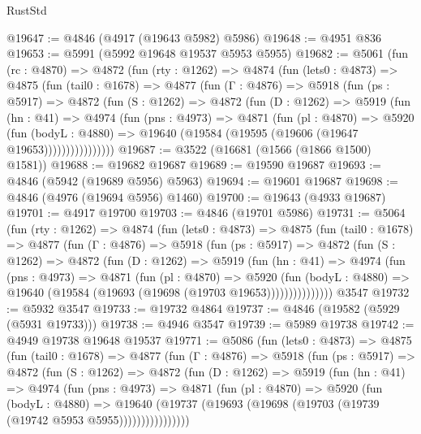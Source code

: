 \begin{lexlean}{RustStd}
\begin{coremodule}
@19647 := @4846 (@4917 (@19643 @5982) @5986)
@19648 := @4951 @836
@19653 := @5991 (@5992 @19648 @19537 @5953 @5955)
@19682 := @5061
    (fun (rc : @4870) =>
    @4872
      (fun (rty : @1262) =>
      @4874
        (fun (lets0 : @4873) =>
        @4875
          (fun (tail0 : @1678) =>
          @4877
            (fun (Γ : @4876) =>
            @5918
              (fun (ps : @5917) =>
              @4872
                (fun (S : @1262) =>
                @4872
                  (fun (D : @1262) =>
                  @5919
                    (fun (hn : @41) =>
                    @4974
                      (fun (pns : @4973) =>
                      @4871
                        (fun (pl : @4870) =>
                        @5920
                          (fun (bodyL : @4880) =>
                          @19640 (@19584 (@19595 (@19606 (@19647 @19653))))))))))))))))
@19687 := @3522 (@16681 (@1566 (@1866 @1500) @1581))
@19688 := @19682 @19687
@19689 := @19590 @19687
@19693 := @4846 (@5942 (@19689 @5956) @5963)
@19694 := @19601 @19687
@19698 := @4846 (@4976 (@19694 @5956) @1460)
@19700 := @19643 (@4933 @19687)
@19701 := @4917 @19700
@19703 := @4846 (@19701 @5986)
@19731 := @5064
    (fun (rty : @1262) =>
    @4874
      (fun (lets0 : @4873) =>
      @4875
        (fun (tail0 : @1678) =>
        @4877
          (fun (Γ : @4876) =>
          @5918
            (fun (ps : @5917) =>
            @4872
              (fun (S : @1262) =>
              @4872
                (fun (D : @1262) =>
                @5919
                  (fun (hn : @41) =>
                  @4974
                    (fun (pns : @4973) =>
                    @4871
                      (fun (pl : @4870) =>
                      @5920
                        (fun (bodyL : @4880) =>
                        @19640 (@19584 (@19693 (@19698 (@19703 @19653)))))))))))))))
    @3547
@19732 := @5932 @3547
@19733 := @19732 @4864
@19737 := @4846 (@19582 (@5929 (@5931 @19733)))
@19738 := @4946 @3547
@19739 := @5989 @19738
@19742 := @4949 @19738 @19648 @19537
@19771 := @5086
    (fun (lets0 : @4873) =>
    @4875
      (fun (tail0 : @1678) =>
      @4877
        (fun (Γ : @4876) =>
        @5918
          (fun (ps : @5917) =>
          @4872
            (fun (S : @1262) =>
            @4872
              (fun (D : @1262) =>
              @5919
                (fun (hn : @41) =>
                @4974
                  (fun (pns : @4973) =>
                  @4871
                    (fun (pl : @4870) =>
                    @5920
                      (fun (bodyL : @4880) =>
                      @19640
                        (@19737 (@19693 (@19698 (@19703 (@19739 (@19742 @5953 @5955))))))))))))))))

\end{coremodule}
\end{lexlean}
